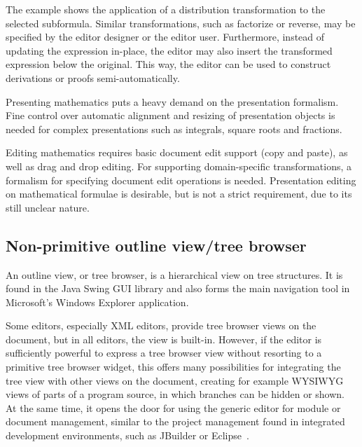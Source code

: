 
The example shows the application of a distribution transformation to the selected subformula. Similar transformations, such as factorize or reverse, may be specified by the editor designer or the editor user. Furthermore, instead of updating the expression in-place, the editor may also insert the transformed expression below the original. This way, the editor can be used to construct derivations or proofs semi-automatically.


Presenting mathematics puts a heavy demand on the presentation formalism. Fine control over automatic alignment and resizing of presentation objects is needed for complex presentations such as integrals, square roots and fractions. 

Editing mathematics requires basic document edit support (copy and paste), as well as drag and drop editing. For supporting domain-specific transformations, a formalism for specifying document edit operations is needed. Presentation editing on mathematical formulae is desirable, but is not a strict requirement, due to its still unclear nature.


%																
\subsection{Non-primitive outline view/tree browser}\label{sect:treeBrowser}

An outline view, or tree browser, is a hierarchical view on tree structures. It is found in the Java Swing GUI library and also forms the main navigation tool in Microsoft's Windows Explorer application. 


Some editors, especially XML editors, provide tree browser views on the document, but in all editors, the view is built-in. However, if the editor is sufficiently powerful to express a tree browser view without resorting to a primitive tree browser widget, this offers many possibilities for integrating the tree view with other views on the document, creating for example WYSIWYG views of parts of a program source, in which branches can be hidden or shown. At the same time, it opens the door for using the generic editor for module or document management, similar to the project management found in integrated development environments, such as JBuilder or Eclipse~\cite{eclipse2001}.

